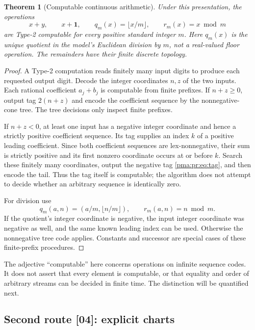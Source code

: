 \documentclass[11pt]{article}
\numberwithin{equation}{section}
\newtheorem{theorem}{Theorem}[section]
\theoremstyle{definition}
\theoremstyle{remark}
\newcommand{\one}{\mathbf 1}
\newcommand{\src}[1]{\textup{\textsf{\small[#1]}}}
\begin{document}
\begin{theorem}[Computable continuous arithmetic]
\label{pma:pr:thm:effectiveops}
Under this presentation, the operations
\[
 x+y,\qquad x+\one,\qquad
 q_m(x)=\lfloor x/m\rfloor,\qquad r_m(x)=x\bmod m
\]
are Type-2 computable for every positive standard integer $m$. Here
$q_m(x)$ is the unique quotient in the model's Euclidean division by $m$,
not a real-valued floor operation. The remainders have their finite
discrete topology.
\end{theorem}
\begin{proof}
A Type-2 computation reads finitely many input digits to produce each
requested output digit. Decode the integer coordinates $n,z$ of the two
inputs. Each rational coefficient $a_j+b_j$ is computable from finite
prefixes. If $n+z\geq0$, output tag $2(n+z)$ and encode the coefficient
sequence by the nonnegative-cone tree. The tree decisions only inspect
finite prefixes.

If $n+z<0$, at least one input has a negative integer coordinate and hence
a strictly positive coefficient sequence. Its tag supplies an index $k$
of a positive leading coefficient. Since both coefficient sequences are
lex-nonnegative, their sum is strictly positive and its first nonzero
coordinate occurs at or before $k$. Search these finitely many
coordinates, output the negative tag \eqref{pma:pr:eq:tag}, and then encode the
tail. Thus the tag itself is computable; the algorithm does not attempt
to decide whether an arbitrary sequence is identically zero.

For division use
\[
 q_m(a,n)=(a/m,\lfloor n/m\rfloor),\qquad
 r_m(a,n)=n\bmod m.
\]
If the quotient's integer coordinate is negative, the input integer
coordinate was negative as well, and the same known leading index can
be used. Otherwise the nonnegative tree code applies. Constants and
successor are special cases of these finite-prefix procedures.
\end{proof}

The adjective ``computable'' here concerns operations on infinite
sequence codes. It does not assert that every element is computable,
or that equality and order of arbitrary streams can be decided in finite
time. The distinction will be quantified next.

\subsection{Second route \src{04}: explicit charts}\label{pma:pr:s04:sec:baire}
\end{document}
